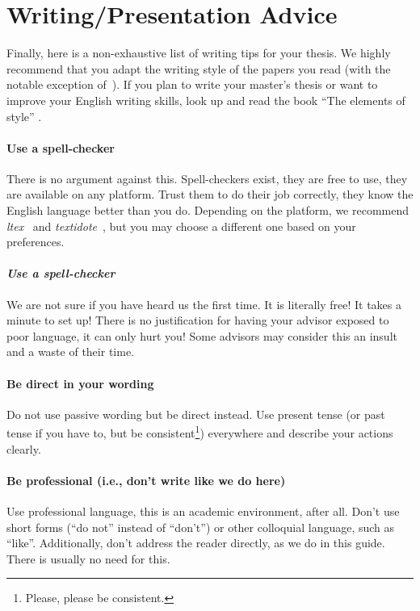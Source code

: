 \documentclass[a4]{article}
\begin{document}
\section{Writing/Presentation Advice}
\label{sec:writing}

Finally, here is a non-exhaustive list of writing tips for your thesis.
We highly recommend that you adapt the writing style of the papers you read (with the notable exception of~\cite{lamport1998part}).
If you plan to write your master's thesis or want to improve your English writing skills, look up and read the book ``The elements of style'' \cite{strunkelements}.


\paragraph{Use a spell-checker}
There is no argument against this.
Spell-checkers exist, they are free to use, they are available on any platform.
Trust them to do their job correctly, they know the English language better than you do.
Depending on the platform, we recommend \emph{ltex}~\cite{ltex} and \emph{textidote}~\cite{textidote}, but you may choose a different one based on your preferences.

\paragraph{\textit{Use a spell-checker}}
We are not sure if you have heard us the first time.
It is literally free!
It takes a minute to set up!
There is no justification for having your advisor exposed to poor language, it can only hurt you!
Some advisors may consider this an insult and a waste of their time.

\paragraph{Be direct in your wording}
Do not use passive wording but be direct instead.
Use present tense (or past tense if you have to, but be consistent\footnote{Please, please be consistent.}) everywhere and describe your actions clearly.

\paragraph{Be professional (i.e., don't write like we do here)}
Use professional language, this is an academic environment, after all.
Don't use short forms (``do not'' instead of ``don't'') or other colloquial language, such as ``like''.
Additionally, don't address the reader directly, as we do in this guide.
There is usually no need for this.
\end{document}
